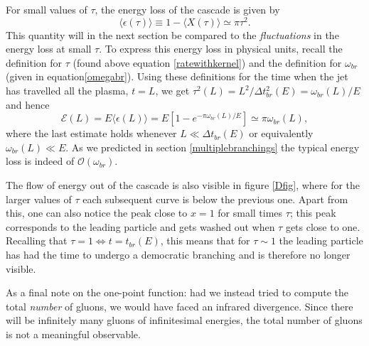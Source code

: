 \documentclass[a4paper,12pt]{article}
\numberwithin{equation}{section}
\begin{document}
For small values of $\tau$, the energy loss of the cascade is given by
\begin{equation}\label{epsilon}
 \langle \epsilon(\tau) \rangle \equiv 1- \langle X(\tau)\rangle \simeq \pi \tau^2.
\end{equation}
This quantity will in the next section be compared to the \emph{fluctuations} in the energy loss at small $\tau$. To express this energy loss in physical units, recall the definition for $\tau$ (found above equation \eqref{ratewithkernel}) and the definition for $\omega_{br}$ (given in equation\eqref{omegabr}). Using these definitions for the time when the jet has travelled all the plasma, $t=L$, we get $\tau^2(L)=L^2/\Delta t^2_{br}(E)=\omega_{br}(L)/E$ and hence 
\begin{equation}
\mathcal{E}(L)=E\langle \epsilon(L) \rangle = E \left[ 1-e^{-\pi {\omega_{br}(L)}/{E}} \right] \simeq \pi \omega_{br}(L),
\end{equation}
where the last estimate holds whenever $L\ll \Delta t_{br}(E)$ or equivalently $\omega_{br}(L) \ll E$. As we predicted in section \ref{multiplebranchings} the typical energy loss is indeed of $\mathcal{O}(\omega_{br})$.


The flow of energy out of the cascade is also visible in figure \ref{Dfig}, where for the larger values of $\tau$ each subsequent curve is below the previous one. Apart from this, one can also notice the peak close to $x=1$ for small times $\tau$; this peak corresponds to the leading particle and gets washed out when $\tau$ gets close to one. Recalling that $\tau=1 \Leftrightarrow t=t_{br}(E)$, this means that for $\tau \sim 1$ the leading particle has had the time to undergo a democratic branching and is therefore no longer visible.



As a final note on the one-point function: had we instead tried to compute the total \emph{number} of gluons, we would have faced an infrared divergence. Since there will be infinitely many gluons of infinitesimal energies, the total number of gluons is not a meaningful observable.
\end{document}
